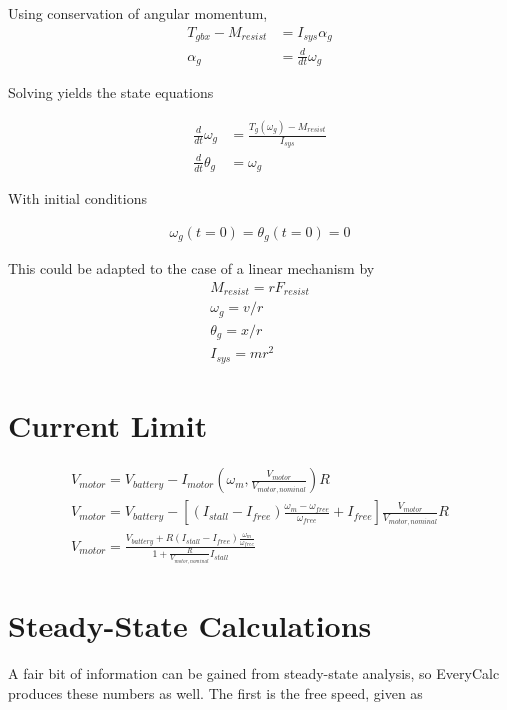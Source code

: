 \documentclass[10pt,letterpaper]{article}
\begin{document}
	Using conservation of angular momentum,
	\begin{align}
		T_{gbx} - M_{resist} &= I_{sys} \alpha_{g} \\
		\alpha_{g} &= \frac{d}{dt} \omega_{g}
	\end{align}

	Solving yields the state equations

	\begin{align}
		\frac{d}{dt} \omega_{g} &= \frac{T_{g}(\omega_{g}) - M_{resist}}{I_{sys}} \\
		\frac{d}{dt} \theta_{g} &= \omega_{g}
	\end{align}

	With initial conditions

	\begin{align}
		\omega_g(t=0) = \theta_g(t=0) = 0 
	\end{align}

	This could be adapted to the case of a linear mechanism by
	\begin{align}
		M_{resist} = r F_{resist} \\
		\omega_g   = v / r \\
		\theta_g   = x / r \\
		I_{sys}    = m r^2
	\end{align}

	\section{Current Limit}

	\begin{align}
		V_{motor} = V_{battery} - I_{motor}(\omega_m, \frac{V_{motor}}{V_{motor,nominal}}) R \\
		V_{motor} = V_{battery} - [(I_{stall} - I_{free})\frac{\omega_{m} - \omega_{free}}{\omega_{free}} + I_{free}] \frac{V_{motor}}{V_{motor,nominal}} R \\
		V_{motor} = \frac{V_{battery} + R (I_{stall}-I_{free}) \frac{\omega_m}{\omega_{free}}}{1 + \frac{R}{V_{motor,nominal}} I_{stall}}
	\end{align}

	\section{Steady-State Calculations}
	A fair bit of information can be gained from steady-state analysis, so EveryCalc produces these numbers as well. The first is the free speed, given as
\end{document}
